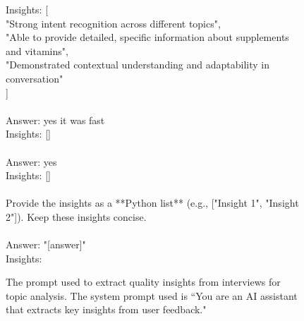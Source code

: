 \begin{figure*}[h]
\begin{tcolorbox}[colback=gray!1, colframe=black!50, title=Insight Filtering Prompt:]
  \hspace*{1em}Insights: [\\
      \hspace*{2em}"Strong intent recognition across different topics",\\
      \hspace*{2em}"Able to provide detailed, specific information about supplements and vitamins",\\
      \hspace*{2em}"Demonstrated contextual understanding and adaptability in conversation"\\
    \hspace*{1em}]\\
\\
  \hspace*{1em}Answer: yes it was fast\\
  \hspace*{1em}Insights: []\\
\\
  \hspace*{1em}Answer: yes\\
  \hspace*{1em}Insights: []\\
\\
Provide the insights as a **Python list** (e.g., ["Insight 1", "Insight 2"]). Keep these insights concise.\\
\\
Answer: "[answer]"\\
Insights:\\
\end{tcolorbox}
    \caption{The prompt used to extract quality insights from interviews for topic analysis. The system prompt used is ``You are an AI assistant that extracts key insights from user feedback."}
    \label{fig:insight_extractor_prompt}
\end{figure*}